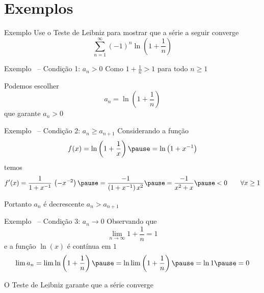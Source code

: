 \documentclass[fleqn,utf8,aspectratio=169,12pt]{beamer}
\begin{document}
\section{Exemplos}

\addtocounter{exemplo}{1}
\begin{frame}{Exemplo \theexemplo}
  Use o Teste de Leibniz para mostrar que a série a seguir converge
  \[
    \sum_{n=1}^\infty(-1)^{n}\ln\left(1+\frac{1}{n}\right)
  \]
\end{frame}

\begin{frame}{Exemplo \theexemplo\ -- Condição 1: \(a_n>0\)}
  \pause
  Como
  \(
    1 + \frac{1}{n} > 1
  \)
  para todo $n\geq 1$

  \pause
  \vspace{\baselineskip}
  Podemos escolher
  \[
    a_n = \ln\left(1+\frac{1}{n}\right)
  \]
  que garante $a_n>0$
\end{frame}

\begin{frame}{Exemplo \theexemplo\ -- Condição 2: \(a_n\geq a_{n+1}\)}
  \pause
  Considerando a função
  \[
    f(x)
    = \ln\left(1+\frac{1}{x}\right)
    \pause
    = \ln\left(1+x^{-1}\right)
  \]
  \pause
  temos
  \[
    f'(x)
    = \frac{1}{1+x^{-1}} \, \left(-x^{-2}\right)
    \pause
    = \frac{-1}{\left(1+x^{-1}\right)x^2}
    \pause
    = \frac{-1}{x^2+x}
    \pause
    < 0
    \qquad \forall x\geq 1
  \]

  \pause
  \vspace{0.5\baselineskip}
  Portanto $a_n$ é decrescente \(a_n>a_{n+1}\)
\end{frame}

\begin{frame}{Exemplo \theexemplo\ -- Condição 3: \(a_n\to 0\)}
  \pause
  Observando que
  \[
    \lim_{n\to\infty} 1+\frac{1}{n} = 1
  \]
  \pause
  e a função $\ln(x)$ é contínua em $1$
  \pause
  \[
    \lim a_n
    = \lim \ln \left(1+\frac{1}{n}\right)
    \pause
    = \ln\lim \left(1+\frac{1}{n}\right)
    \pause
    = \ln 1
    \pause
    = 0
  \]

  \pause
  O Teste de Leibniz garante que a série converge
\end{frame}
\end{document}
